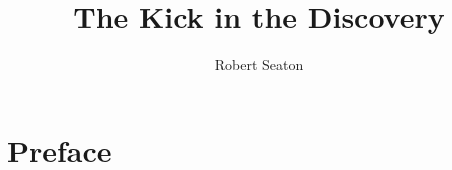 \documentclass{tufte-book}
\author{Robert Seaton}
\title{The Kick in the Discovery}
\begin{document}
\maketitle
\frontmatter
\tableofcontents

\chapter*{Preface}


\mainmatter

%
%
%
%
%

\backmatter
% 
% 

\printindex %
\end{document}
